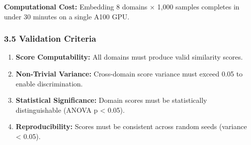 \textbf{Computational Cost:} Embedding 8 domains $\times$ 1,000 samples completes in under 30 minutes on a single A100 GPU.

\subsubsection{3.5 Validation Criteria}

\begin{enumerate}
\item \textbf{Score Computability:} All domains must produce valid similarity scores.
\item \textbf{Non-Trivial Variance:} Cross-domain score variance must exceed 0.05 to enable discrimination.
\item \textbf{Statistical Significance:} Domain scores must be statistically distinguishable (ANOVA p < 0.05).
\item \textbf{Reproducibility:} Scores must be consistent across random seeds (variance < 0.05).
\end{enumerate}

